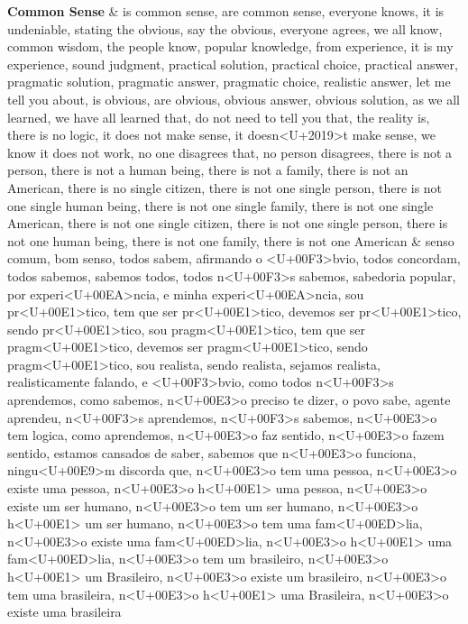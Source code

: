 \documentclass[
  12pt,
]{article}
\begin{document}
\begin{landscape}
\begin{longtabu}
\textbf{Common Sense} & is common sense, are common sense, everyone knows, it is undeniable, stating the obvious, say the obvious, everyone agrees, we all know, common wisdom, the people know, popular knowledge, from experience, it is my experience, sound judgment, practical solution, practical choice, practical answer, pragmatic solution, pragmatic answer, pragmatic choice, realistic answer, let me tell you about, is obvious, are obvious, obvious answer, obvious solution, as we all learned, we have all learned that, do not need to tell you that, the reality is, there is no logic, it does not make sense, it doesn<U+2019>t make sense, we know it does not work, no one disagrees that, no person disagrees, there is not a person, there is not a human being, there is not a family, there is not an American, there is no single citizen, there is not one single person, there is not one single human being, there is not one single family, there is not one single American, there is not one single citizen, there is not one single person, there is not one human being, there is not one family, there is not one American & senso comum, bom senso, todos sabem, afirmando o <U+00F3>bvio, todos concordam, todos sabemos, sabemos todos, todos n<U+00F3>s sabemos, sabedoria popular, por experi<U+00EA>ncia, e minha experi<U+00EA>ncia, sou pr<U+00E1>tico, tem que ser pr<U+00E1>tico, devemos ser pr<U+00E1>tico, sendo pr<U+00E1>tico, sou pragm<U+00E1>tico, tem que ser pragm<U+00E1>tico, devemos ser  pragm<U+00E1>tico, sendo pragm<U+00E1>tico, sou realista, sendo realista, sejamos realista, realisticamente falando, e <U+00F3>bvio, como todos n<U+00F3>s aprendemos, como sabemos, n<U+00E3>o preciso te dizer, o povo sabe, agente aprendeu, n<U+00F3>s aprendemos, n<U+00F3>s sabemos, n<U+00E3>o tem logica, como aprendemos, n<U+00E3>o faz sentido, n<U+00E3>o fazem sentido, estamos cansados de saber, sabemos que n<U+00E3>o funciona, ningu<U+00E9>m discorda que, n<U+00E3>o tem uma pessoa, n<U+00E3>o existe uma pessoa, n<U+00E3>o h<U+00E1> uma pessoa, n<U+00E3>o existe um ser humano, n<U+00E3>o tem um ser humano, n<U+00E3>o h<U+00E1> um ser humano, n<U+00E3>o tem uma fam<U+00ED>lia, n<U+00E3>o existe uma fam<U+00ED>lia, n<U+00E3>o h<U+00E1> uma fam<U+00ED>lia, n<U+00E3>o tem um brasileiro, n<U+00E3>o h<U+00E1> um Brasileiro, n<U+00E3>o existe um brasileiro, n<U+00E3>o tem uma brasileira, n<U+00E3>o h<U+00E1> uma Brasileira, n<U+00E3>o existe uma brasileira\\

\end{longtabu}
\end{landscape}
\end{document}
